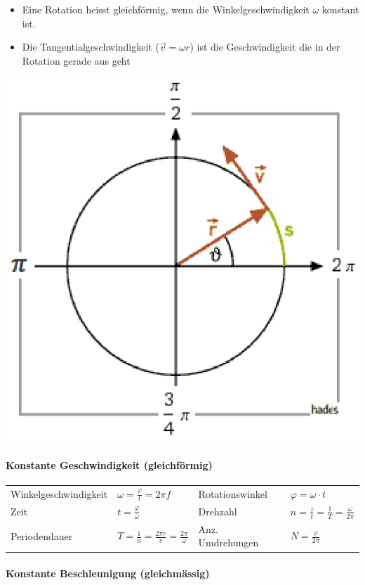 \documentclass[
a4paper,
oneside,
landscape, 
8pt,
]{scrartcl}
\begin{document}
\begin{multicols*}{2}
\begin{itemize}
	\item Eine Rotation heisst gleichförmig, wenn die Winkelgeschwindigkeit $\omega$ konstant ist. 
	\item Die Tangentialgeschwindigkeit ($\vec{v}=\omega r$) ist die Geschwindigkeit die in der Rotation gerade aus geht
\end{itemize}

\includegraphics[width=0.2\linewidth]{images/rotation}

\paragraph{Konstante Geschwindigkeit (gleichförmig)}

\begin{tabbing}
	\begin{tabu} to \linewidth {l X l X}
		\toprule
		Winkelgeschwindigkeit & $\omega = \frac{\varphi}{t} = 2 \pi f$ &
		Rotationswinkel & $\varphi = \omega \cdot t$ \\
		Zeit & $t = \frac{\varphi}{\omega}$ &
		Drehzahl & $n = \frac{z}{t} = \frac{1}{T} = \frac{\omega}{2 \pi}$  \\
		Periodendauer & $T = \frac{1}{n} = \frac{2\pi r}{v} = \frac{2\pi}{\omega}$ &
		Anz. Umdrehungen & $N = \frac{\varphi}{2 \pi}$ \\
		\bottomrule
	\end{tabu}
\end{tabbing}

\paragraph{Konstante Beschleunigung (gleichmässig)}


\end{multicols*}
\end{document}
